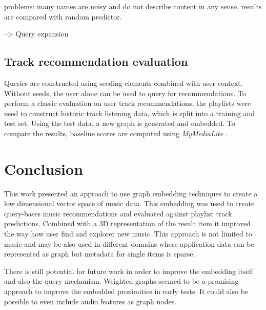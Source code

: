 \documentclass[sigconf]{acmart}
\begin{document}

problems: many names are noisy and do not describe content in any sense. results are compared with random predictor.

--> Query expansion




\subsection{Track recommendation evaluation}
\label{subsec:track_rec_eval}
Queries are constructed using seeding elements combined with user context. Without seeds, the user alone can be used to query for recommendations. To perform a classic evaluation on user track recommendations, the playlists were used to construct historic track listening data, which is split into a training and test set. Using the test data, a new graph is generated and embedded. To compare the results, baseline scores are computed using \emph{MyMediaLite} \cite{Gantner2011MyMediaLite}.





\section{Conclusion}
This work presented an approach to use graph embedding techniques to create a low dimensional vector space of music data. This embedding was used to create query-bases music recommendations and evaluated against playlist track predictions. Combined with a 3D representation of the result item it improved the way how user find and explorer new music. 
This approach is not limited to music and may be also used in different domains where application data can be represented as graph but metadata for single items is sparse.

There is still potential for future work in order to improve the embedding itself and also the query mechanism. Weighted graphs seemed to be a promising approach to improve the embedded proximities in early tests. It could also be possible to even include audio features as graph nodes.




\end{document}
